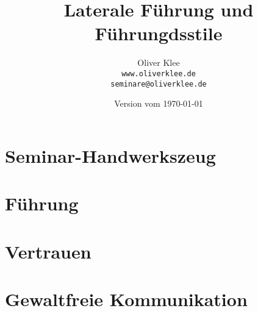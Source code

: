 \documentclass[a4paper,openany,twoside,titlepage,10pt,headsepline]{scrbook}
\title{Laterale Führung und Führungdsstile}
\author{Oliver Klee\\\texttt{www.oliverklee.de}\\\texttt{seminare@oliverklee.de}}
\date{Version vom \today}
\begin{document}
\frontmatter

\maketitle

\tableofcontents


\mainmatter

\chapter{Seminar-Handwerkszeug}





\chapter{Führung}












\chapter{Vertrauen}



\chapter{Gewaltfreie Kommunikation}





\backmatter





\printindex
\end{document}
